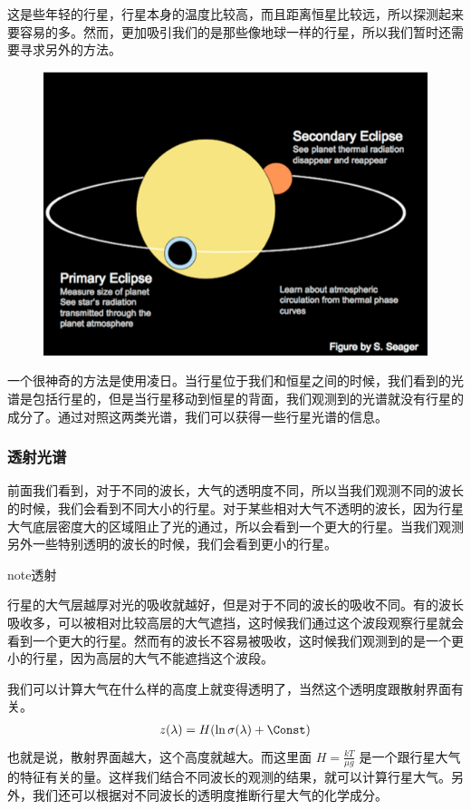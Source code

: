 \documentclass[letterpaper,10pt,english]{sphinxmanual}
\begin{document}
这是些年轻的行星，行星本身的温度比较高，而且距离恒星比较远，所以探测起来要容易的多。然而，更加吸引我们的是那些像地球一样的行星，所以我们暂时还需要寻求另外的方法。
\begin{figure}[htbp]
\centering

\includegraphics{transit.png}
\end{figure}

一个很神奇的方法是使用凌日。当行星位于我们和恒星之间的时候，我们看到的光谱是包括行星的，但是当行星移动到恒星的背面，我们观测到的光谱就没有行星的成分了。通过对照这两类光谱，我们可以获得一些行星光谱的信息。


\subsubsection{透射光谱}
\label{atmosphere:id7}
前面我们看到，对于不同的波长，大气的透明度不同，所以当我们观测不同的波长的时候，我们会看到不同大小的行星。对于某些相对大气不透明的波长，因为行星大气底层密度大的区域阻止了光的通过，所以会看到一个更大的行星。当我们观测另外一些特别透明的波长的时候，我们会看到更小的行星。

\begin{notice}{note}{透射}

行星的大气层越厚对光的吸收就越好，但是对于不同的波长的吸收不同。有的波长吸收多，可以被相对比较高层的大气遮挡，这时候我们通过这个波段观察行星就会看到一个更大的行星。然而有的波长不容易被吸收，这时候我们观测到的是一个更小的行星，因为高层的大气不能遮挡这个波段。
\end{notice}

我们可以计算大气在什么样的高度上就变得透明了，当然这个透明度跟散射界面有关。
\begin{gather}
\begin{split}z(\lambda) = H (\ln \sigma(\lambda)+\text{\Const})\end{split}\notag
\end{gather}
也就是说，散射界面越大，这个高度就越大。而这里面 \(H=\frac{kT}{\mu g}\) 是一个跟行星大气的特征有关的量。这样我们结合不同波长的观测的结果，就可以计算行星大气。另外，我们还可以根据对不同波长的透明度推断行星大气的化学成分。
\end{document}
